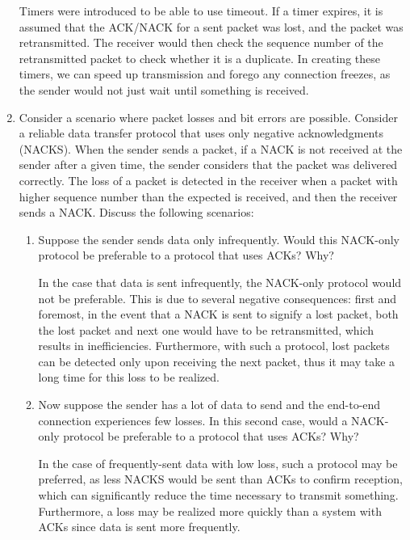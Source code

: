 \begin{enumerate}
    Timers were introduced to be able to use timeout. If a timer expires, it is assumed that the ACK/NACK for a sent packet was lost, and the packet was retransmitted. The receiver would then check the sequence number of the retransmitted packet to check whether it is a duplicate. In creating these timers, we can speed up transmission and forego any connection freezes, as the sender would not just wait until something is received.

  \item Consider a scenario where packet losses and bit errors are possible. Consider a reliable data transfer protocol that uses only negative acknowledgments (NACKS). When the sender sends a packet, if a NACK is not received at the sender after a given time, the sender considers that the packet was delivered correctly. The loss of a packet is detected in the receiver when a packet with higher sequence number than the expected is received, and then the receiver sends a NACK. Discuss the following scenarios:

    \begin{enumerate}

      \item Suppose the sender sends data only infrequently. Would this NACK-only protocol be preferable to a protocol that uses ACKs? Why?

        In the case that data is sent infrequently, the NACK-only protocol would not be preferable. This is due to several negative consequences: first and foremost, in the event that a NACK is sent to signify a lost packet, both the lost packet and next one would have to be retransmitted, which results in inefficiencies. Furthermore, with such a protocol, lost packets can be detected only upon receiving the next packet, thus it may take a long time for this loss to be realized.

      \item Now suppose the sender has a lot of data to send and the end-to-end connection experiences few losses. In this second case, would a NACK-only protocol be preferable to a protocol that uses ACKs? Why?

        In the case of frequently-sent data with low loss, such a protocol may be preferred, as less NACKS would be sent than ACKs to confirm reception, which can significantly reduce the time necessary to transmit something. Furthermore, a loss may be realized more quickly than a system with ACKs since data is sent more frequently. 

    \end{enumerate}


\end{enumerate}
